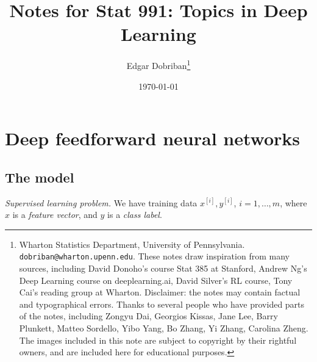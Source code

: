 \documentclass[english]{article}
\begin{document}
\title{Notes for Stat 991: Topics in Deep Learning}
\date{\today}
\author{Edgar Dobriban\footnote{Wharton Statistics Department, University of Pennsylvania. \texttt{dobriban@wharton.upenn.edu}.  These notes draw inspiration from many sources, including David Donoho's course Stat 385 at Stanford, Andrew Ng's Deep Learning course on deeplearning.ai, David Silver's RL course, Tony Cai's reading group at Wharton. Disclaimer: the notes may contain factual and typographical errors. Thanks to several people who have provided parts of the notes, including Zongyu Dai, Georgios Kissas, Jane Lee, Barry Plunkett, Matteo Sordello, Yibo Yang, Bo Zhang, Yi Zhang, Carolina Zheng. The images included in this note are subject to copyright by their rightful owners, and are included here for educational purposes.}}

\maketitle




\tableofcontents

\medskip










\section{Deep feedforward neural networks}
\subsection{The model}
\benum
\item \emph{Supervised learning problem.} We have training data $x^{[i]},y^{[i]}$, $i=1,\ldots, m$, where $x$ is a \emph{feature vector}, and $y$ is a \emph{class label}.
\end{document}
